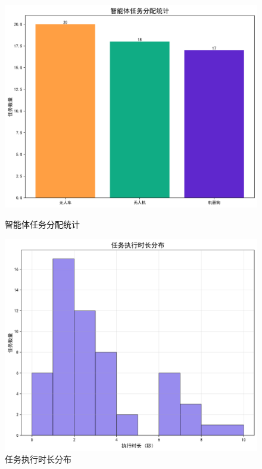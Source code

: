\documentclass[12pt,a4paper]{article}
\begin{document}
\begin{figure}[h]
    \centering
    \begin{minipage}[b]{0.48\textwidth}
        \includegraphics[width=\textwidth]{analysis_results/agent_distribution_20250617_081450.png}
        \caption{智能体任务分配统计}
        \label{fig:agent-distribution}
    \end{minipage}
    \hfill
    \begin{minipage}[b]{0.48\textwidth}
        \includegraphics[width=\textwidth]{analysis_results/duration_histogram_20250617_081450.png}
        \caption{任务执行时长分布}
        \label{fig:duration-histogram}
    \end{minipage}
\end{figure}
\end{document}
